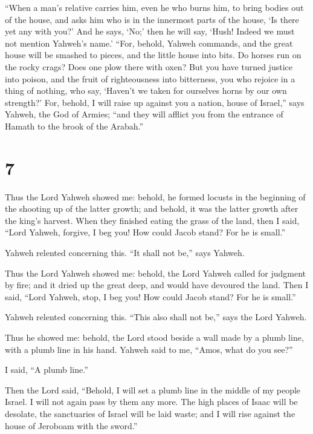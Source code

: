  ``When a man's relative carries him, even he who burns
him, to bring bodies out of the house, and asks him who is in the
innermost parts of the house, `Is there yet any with you?' And he says,
`No;' then he will say, `Hush! Indeed we must not mention Yahweh's
name.'  ``For, behold, Yahweh commands, and the great
house will be smashed to pieces, and the little house into bits.
 Do horses run on the rocky crags? Does one plow there
with oxen? But you have turned justice into poison, and the fruit of
righteousness into bitterness,  you who rejoice in a
thing of nothing, who say, `Haven't we taken for ourselves horns by our
own strength?'  For, behold, I will raise up against you
a nation, house of Israel,'' says Yahweh, the God of Armies; ``and they
will afflict you from the entrance of Hamath to the brook of the
Arabah.''

\hypertarget{section-6}{%
\section{7}\label{section-6}}

 Thus the Lord Yahweh showed me: behold, he formed locusts
in the beginning of the shooting up of the latter growth; and behold, it
was the latter growth after the king's harvest.  When they
finished eating the grass of the land, then I said, ``Lord Yahweh,
forgive, I beg you! How could Jacob stand? For he is small.''

 Yahweh relented concerning this. ``It shall not be,''
says Yahweh.

 Thus the Lord Yahweh showed me: behold, the Lord Yahweh
called for judgment by fire; and it dried up the great deep, and would
have devoured the land.  Then I said, ``Lord Yahweh, stop,
I beg you! How could Jacob stand? For he is small.''

 Yahweh relented concerning this. ``This also shall not
be,'' says the Lord Yahweh.

 Thus he showed me: behold, the Lord stood beside a wall
made by a plumb line, with a plumb line in his hand. 
Yahweh said to me, ``Amos, what do you see?''

I said, ``A plumb line.''

Then the Lord said, ``Behold, I will set a plumb line in the middle of
my people Israel. I will not again pass by them any more. 
The high places of Isaac will be desolate, the sanctuaries of Israel
will be laid waste; and I will rise against the house of Jeroboam with
the sword.''


